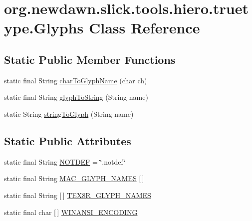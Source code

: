 \hypertarget{classorg_1_1newdawn_1_1slick_1_1tools_1_1hiero_1_1truetype_1_1_glyphs}{}\section{org.\+newdawn.\+slick.\+tools.\+hiero.\+truetype.\+Glyphs Class Reference}
\label{classorg_1_1newdawn_1_1slick_1_1tools_1_1hiero_1_1truetype_1_1_glyphs}
\subsection*{Static Public Member Functions}
\begin{DoxyCompactItemize}
\item 
static final String \mbox{\hyperlink{classorg_1_1newdawn_1_1slick_1_1tools_1_1hiero_1_1truetype_1_1_glyphs_a717eae640170c2ff964fc1414970b51f}{char\+To\+Glyph\+Name}} (char ch)
\item 
static final String \mbox{\hyperlink{classorg_1_1newdawn_1_1slick_1_1tools_1_1hiero_1_1truetype_1_1_glyphs_a7e4b4c2e0649fbf355ea6f7addf96dba}{glyph\+To\+String}} (String name)
\item 
static String \mbox{\hyperlink{classorg_1_1newdawn_1_1slick_1_1tools_1_1hiero_1_1truetype_1_1_glyphs_a50508eacea49c4be9778f84d28b186d4}{string\+To\+Glyph}} (String name)
\end{DoxyCompactItemize}
\subsection*{Static Public Attributes}
\begin{DoxyCompactItemize}
\item 
static final String \mbox{\hyperlink{classorg_1_1newdawn_1_1slick_1_1tools_1_1hiero_1_1truetype_1_1_glyphs_a78f23e9ba748be08a452e8b3a996ceaf}{N\+O\+T\+D\+EF}} = \char`\"{}.notdef\char`\"{}
\item 
static final String \mbox{\hyperlink{classorg_1_1newdawn_1_1slick_1_1tools_1_1hiero_1_1truetype_1_1_glyphs_a48591ce38f9221d8064b6bc7e68124d8}{M\+A\+C\+\_\+\+G\+L\+Y\+P\+H\+\_\+\+N\+A\+M\+ES}} \mbox{[}$\,$\mbox{]}
\item 
static final String \mbox{[}$\,$\mbox{]} \mbox{\hyperlink{classorg_1_1newdawn_1_1slick_1_1tools_1_1hiero_1_1truetype_1_1_glyphs_aea94fa3b44fa9c00c53ec9706033c063}{T\+E\+X8\+R\+\_\+\+G\+L\+Y\+P\+H\+\_\+\+N\+A\+M\+ES}}
\item 
static final char \mbox{[}$\,$\mbox{]} \mbox{\hyperlink{classorg_1_1newdawn_1_1slick_1_1tools_1_1hiero_1_1truetype_1_1_glyphs_a5d401716dd5de36cd43758e92c13f4b4}{W\+I\+N\+A\+N\+S\+I\+\_\+\+E\+N\+C\+O\+D\+I\+NG}}
\end{DoxyCompactItemize}


